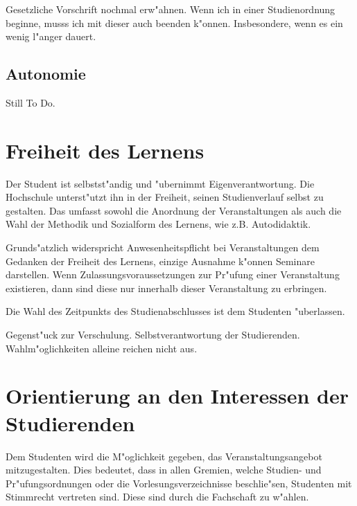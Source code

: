 \begin{kcmt}\begin{komacmt}
	Gesetzliche Vorschrift nochmal erw"ahnen. Wenn ich in einer Studienordnung 
	beginne, musss ich mit dieser auch beenden k"onnen. Insbesondere, wenn es ein wenig l"anger dauert.
\end{komacmt}\end{kcmt}

\begin{stilltodo}
\section{Autonomie}

{\Large{Still To Do.}}
\end{stilltodo}

\section{Freiheit des Lernens}

Der Student ist selbstst"andig und "ubernimmt Eigenverantwortung. Die Hochschule
unterst"utzt ihn in der Freiheit, seinen Studienverlauf selbst zu gestalten.
Das umfasst sowohl die Anordnung der Veranstaltungen als auch die Wahl der Methodik
und Sozialform des Lernens, wie z.B. Autodidaktik.

Grunds"atzlich widerspricht Anwesenheitspflicht bei Veranstaltungen dem Gedanken
der Freiheit des Lernens, einzige Ausnahme k"onnen Seminare darstellen. Wenn Zulassungsvoraussetzungen
zur Pr"ufung einer Veranstaltung existieren, dann sind diese nur innerhalb dieser
Veranstaltung zu erbringen.

Die Wahl des Zeitpunkts des Studienabschlusses ist dem Studenten "uberlassen.

\begin{kcmt}\begin{komacmt}
	Gegenst"uck zur Verschulung. Selbstverantwortung der Studierenden. Wahlm"oglichkeiten alleine reichen nicht aus.
\end{komacmt}\end{kcmt}

\section{Orientierung an den Interessen der Studierenden}
Dem Studenten wird die M"oglichkeit gegeben, das Veranstaltungsangebot mitzugestalten. 
Dies bedeutet, dass in allen Gremien, welche Studien- und Pr"ufungsordnungen oder die 
Vorlesungsverzeichnisse beschlie"sen, Studenten mit Stimmrecht vertreten sind. Diese sind
durch die Fachschaft zu w"ahlen.

